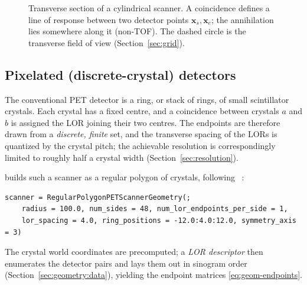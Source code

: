 \begin{figure}[t]
  \centering
  \caption{Transverse section of a cylindrical scanner. A coincidence defines a
    line of response between two detector points $\bm{x}_s,\bm{x}_e$; the
    annihilation lies somewhere along it (non-TOF). The dashed circle is the
    transverse field of view (Section~\ref{sec:grid}).}
  \label{fig:geom-lor}
\end{figure}

\subsection{Pixelated (discrete-crystal) detectors}
\label{sec:geometry:pixelated}

The conventional PET detector is a ring, or stack of rings, of small
scintillator crystals. Each crystal has a fixed centre, and a coincidence
between crystals $a$ and $b$ is assigned the LOR joining their two centres.
The endpoints are therefore drawn from a \emph{discrete, finite} set, and the
transverse spacing of the LORs is quantized by the crystal pitch; the
achievable resolution is correspondingly limited to roughly half a crystal
width (Section~\ref{sec:resolution}).

 builds such a scanner as a regular polygon of crystals,
following ~\cite{schramm2024}:
\begin{lstlisting}
scanner = RegularPolygonPETScannerGeometry(;
    radius = 100.0, num_sides = 48, num_lor_endpoints_per_side = 1,
    lor_spacing = 4.0, ring_positions = -12.0:4.0:12.0, symmetry_axis = 3)
\end{lstlisting}
The crystal world coordinates are precomputed; a \emph{LOR descriptor} then
enumerates the detector pairs and lays them out in sinogram order
(Section~\ref{sec:geometry:data}), yielding the endpoint matrices
\eqref{eq:geom-endpoints}.

